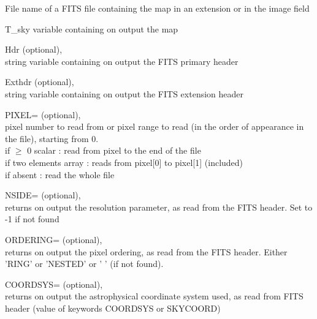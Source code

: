 \begin{qualifiers}
  \begin{qulist}{} %
 	\item[{File}] 
          name of a FITS file containing 
               the \healpix map in an extension or in the image field 

 	\item[{T\_sky}] 
	variable containing on output the \healpix map

       \item[{Hdr}]
		  (optional), \\
		string variable containing on output
		  the FITS primary header

       \item[{Exthdr}]
		  (optional), \\
		string variable containing on output
		  the FITS extension header

  	\item[{PIXEL=}] 
		(optional), \\
               pixel number to read from or pixel range to read
                 (in the order of appearance in the file), starting from 0. \\
               if $\ge$ 0 scalar        : read from pixel to the end of the file \\
               if two elements array : reads from pixel[0] to pixel[1]
		(included) \\
               if absent             : read the whole file

	 \item[{NSIDE=}]
		(optional), \\
	        returns on output the \healpix resolution parameter, as read
		from the FITS header. Set to -1 if not found

	 \item[{ORDERING=}]
	        (optional), \\
	        returns on output the pixel ordering, as read from the FITS
	        header. Either 'RING' or 'NESTED' or ' ' (if not found).

	 \item[{COORDSYS=}]
	        (optional), \\
	        returns on output the astrophysical coordinate system used, 
		as read from FITS header (value of keywords COORDSYS or SKYCOORD)

 

  \end{qulist}
\end{qualifiers}

